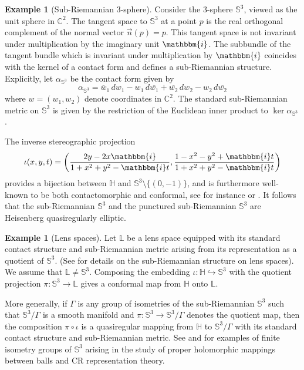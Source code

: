 \documentclass[10pt,letterpaper]{amsart}
\theoremstyle{definition}
\newtheorem{example}[thm]{Example}
\numberwithin{thm}{subsection}
\numberwithin{equation}{section}
\begin{document}
\begin{example}[Sub-Riemannian $3$-sphere]
\label{ex:sphere1}
Consider the $3$-sphere ${\mathbb S}^3$, viewed as the unit sphere in ${\mathbb C}^2$. The tangent space to ${\mathbb S}^3$ at a point $p$ is the real orthogonal complement of the normal vector $\vec{n}(p) = p$. This tangent space is not invariant under multiplication by the imaginary unit ${\mathbbm{i}}$. The subbundle of the tangent bundle which is invariant under multiplication by ${\mathbbm{i}}$ coincides with the kernel of a contact form and defines a sub-Riemannian structure. Explicitly, let $\alpha_{{\mathbb S}^3}$ be the contact form given by
$$
\alpha_{{\mathbb S}^3} = \overline w_1 \, dw_1 - w_1 \, d\overline{w_1} + \overline{w_2} \, dw_2 - w_2 \, d\overline{w_2}
$$
where $w = (w_1,w_2)$ denote coordinates in ${\mathbb C}^2$. The standard
sub-Riemannian metric on ${\mathbb S}^3$ is given by the restriction of
the Euclidean inner product to $\ker \alpha_{{\mathbb S}^3}$.

The inverse stereographic projection
$$
\iota(x,y,t) = \left( \frac{2y-2x{\mathbbm{i}}}{1+x^2 + y^2 - {\mathbbm{i}} t}, \frac{1-x^2 - y^2 + {\mathbbm{i}} t}{1+x^2 + y^2 - {\mathbbm{i}} t}\right)
$$
provides a bijection between ${\mathbb H}$ and ${\mathbb S}^3\setminus\{(0,-1)\}$, and is furthermore well-known to be both contactomorphic and conformal, see for instance \cite[p.\ 315]{KoRe1985} or \cite[Section 3.3]{CDPT}. It follows that the sub-Riemannian ${\mathbb S}^3$ and the punctured sub-Riemannian ${\mathbb S}^3$ are Heisenberg quasiregularly elliptic.
\end{example}

\begin{example}[Lens spaces]
Let $\mathbb L$ be a lens space equipped with its standard contact structure and sub-Riemannian metric arising from its representation as a quotient of ${\mathbb S}^3$.
(See \cite[Section 3.1]{FLP} for details on the sub-Riemannian structure on lens spaces). We assume that $\mathbb L \ne {\mathbb S}^3$.
Composing the embedding $\iota: {\mathbb H} \hookrightarrow {\mathbb S}^3$ with the quotient projection $\pi: {\mathbb S}^3\rightarrow \mathbb L$ gives a conformal map from ${\mathbb H}$ onto $\mathbb L$.

More generally, if $\Gamma$ is any group of isometries of the sub-Riemannian ${\mathbb S}^3$ such that ${\mathbb S}^3/\Gamma$ is a smooth manifold and $\pi:{\mathbb S}^3 \to {\mathbb S}^3/\Gamma$ denotes the quotient map, then the composition $\pi \circ \iota$ is a quasiregular mapping from ${\mathbb H}$ to $\mathbb {\mathbb S}^3/\Gamma$ with its standard contact structure and sub-Riemannian metric. See \cite{MR2051684} and
\cite{MR2782691} for examples of finite isometry groups of ${\mathbb S}^3$ arising in the study of proper holomorphic mappings between balls and CR representation theory.
\end{example}
\end{document}
